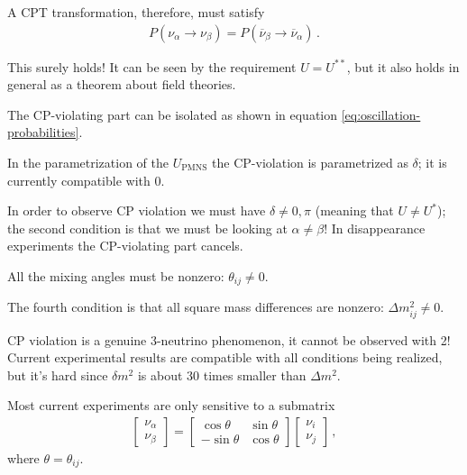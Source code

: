 \documentclass[main.tex]{subfiles}
\begin{document}

A CPT transformation, therefore, must satisfy 
%
\begin{align}
P(\nu _\alpha \to \nu _\beta ) = P(\overline{\nu}_\beta \to \overline{\nu}_\alpha )
\,.
\end{align}

This surely holds! It can be seen by the requirement \(U = U^{**}\), but it also holds in general as a theorem about field theories.

The CP-violating part can be isolated as shown in equation \eqref{eq:oscillation-probabilities}. 

In the parametrization of the \(U _{\text{PMNS}}\) the CP-violation is parametrized as \(\delta \); it is currently compatible with 0. 

In order to observe CP violation we must have \(\delta \neq 0, \pi \) (meaning that \(U \neq U^{*}\));
the second condition is that we must be looking at \(\alpha \neq \beta \)! In disappearance experiments the CP-violating part cancels. 

All the mixing angles must be nonzero: \(\theta_{ij} \neq 0\). 

The fourth condition is that all square mass differences are nonzero: \(\Delta m^2_{ij} \neq 0\). 

CP violation is a genuine 3-neutrino phenomenon, it cannot be observed with 2! 
Current experimental results are compatible with all conditions being realized, but it's hard since \(\delta m^2\) is about 30 times smaller than \(\Delta m^2\).

Most current experiments are only sensitive to a submatrix 
%
\begin{align}
\left[\begin{array}{c}
\nu _\alpha  \\ 
\nu _\beta 
\end{array}\right]
= 
\left[\begin{array}{cc}
\cos \theta  & \sin \theta  \\ 
-\sin \theta  & \cos \theta 
\end{array}\right]
\left[\begin{array}{c}
\nu _i  \\ 
\nu _j 
\end{array}\right]
\,,
\end{align}
%
where \(\theta = \theta_{ij}\). 
\end{document}
